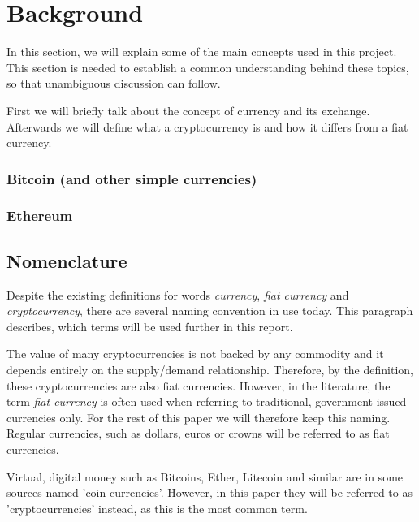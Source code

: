 \section{Background}
% 
In this section, we will explain some of the main concepts used in this project. This section is needed to establish a common understanding behind these topics, so that unambiguous discussion can follow.

First we will briefly talk about the concept of currency and its exchange. Afterwards we will define what a cryptocurrency is and how it differs from a fiat currency. 
% 

% 

% 

% 


\subsubsection{Bitcoin (and other simple currencies)}
\subsubsection{Ethereum}

\subsection{Nomenclature}
Despite the existing definitions for words \textit{currency}, \textit{fiat currency} and \textit{cryptocurrency}, there are several naming convention in use today. This paragraph describes, which terms will be used further in this report.

The value of many cryptocurrencies is not backed by any commodity and it depends entirely on the supply/demand relationship. Therefore, by the definition, these cryptocurrencies are also fiat currencies. However, in the literature, the term \emph{fiat currency} is often used when referring to traditional, government issued currencies only. For the rest of this paper we will therefore keep this naming. Regular currencies, such as dollars, euros or crowns will be referred to as fiat currencies.

Virtual, digital money such as Bitcoins, Ether, Litecoin and similar are in some sources named 'coin currencies'. However, in this paper they will be referred to as 'cryptocurrencies' instead, as this is the most common term.